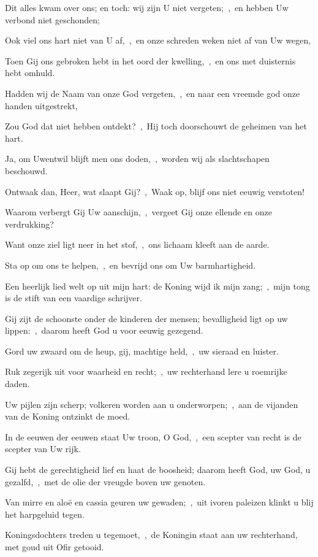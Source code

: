 \documentclass[12pt,twoside,a5paper]{article}
\begin{document}
\begin{halfparskip}
  Dit alles kwam over ons; en toch: wij zijn U niet vergeten;~\sep\ en hebben Uw verbond niet geschonden;

  Ook viel ons hart niet van U af,~\sep\ en onze schreden weken niet af van Uw wegen,

  Toen Gij ons gebroken hebt in het oord der kwelling,~\sep\ en ons met duisternis hebt omhuld.

  Hadden wij de Naam van onze God vergeten,~\sep\ en naar een vreemde god onze handen uitgestrekt,

  Zou God dat niet hebben ontdekt?~\sep\ Hij toch doorschouwt de geheimen van het hart.

  Ja, om Uwentwil blijft men ons doden,~\sep\ worden wij als slachtschapen beschouwd.

  Ontwaak dan, Heer, wat slaapt Gij?~\sep\ Waak op, blijf ons niet eeuwig verstoten!

  Waarom verbergt Gij Uw aanschijn,~\sep\ vergeet Gij onze ellende en onze verdrukking?

  Want onze ziel ligt neer in het stof,~\sep\ ons lichaam kleeft aan de aarde.

  Sta op om ons te helpen,~\sep\ en bevrijd ons om Uw barmhartigheid.

   Een heerlijk lied welt op uit mijn hart: de Koning wijd ik mijn zang;~\sep\ mijn tong is de stift van een vaardige schrijver.

  Gij zijt de schoonste onder de kinderen der mensen; bevalligheid ligt op uw lippen:~\sep\ daarom heeft God u voor eeuwig gezegend.

  Gord uw zwaard om de heup, gij, machtige held,~\sep\ uw sieraad en luister.

  Ruk zegerijk uit voor waarheid en recht;~\sep\ uw rechterhand lere u roemrijke daden.

  Uw pijlen zijn scherp; volkeren worden aan u onderworpen;~\sep\ aan de vijanden van de Koning ontzinkt de moed.

  In de eeuwen der eeuwen staat Uw troon, O God,~\sep\ een scepter van recht is de scepter van Uw rijk.

  Gij hebt de gerechtigheid lief en haat de boosheid; daarom heeft God, uw God, u gezalfd,~\sep\ met de olie der vreugde boven uw genoten.

  Van mirre en aloë en cassia geuren uw gewaden;~\sep\ uit ivoren paleizen klinkt u blij het harpgeluid tegen.

  Koningsdochters treden u tegemoet,~\sep\ de Koningin staat aan uw rechterhand, met goud uit Ofir getooid.


\end{halfparskip}
\end{document}
